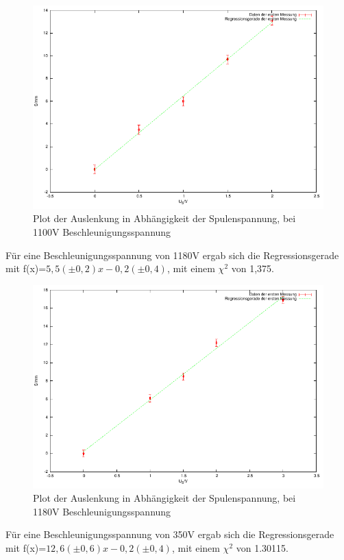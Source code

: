 \documentclass[12pt]{scrartcl}
\begin{document}
\begin{figure}[htbp] 
  \centering
    \includegraphics[scale = 1]{b_1.pdf}
  	\caption[Plot der Auslenkung in Abhängigkeit der Spulenspannung, bei 1100V Beschleunigungsspannung]{Plot der Auslenkung in Abhängigkeit der Spulenspannung, bei 1100V Beschleunigungsspannung}
  \label{fig:x_1}
\end{figure}

\newpage

Für eine Beschleunigungsspannung von 1180V ergab sich die Regressionsgerade mit f(x)=$5,5 (\pm 0,2) x  - 0,2 (\pm 0,4)$, mit einem $\chi^2$ von 1,375.

\begin{figure}[htbp] 
  \centering
    \includegraphics[scale = 1]{b_2.pdf}
  	\caption[Plot der Auslenkung in Abhängigkeit der Spulenspannung, bei 1180V Beschleunigungsspannung]{Plot der Auslenkung in Abhängigkeit der Spulenspannung, bei 1180V Beschleunigungsspannung}
  \label{fig:x_1}
\end{figure}
\newpage
Für eine Beschleunigungsspannung von 350V ergab sich die Regressionsgerade mit f(x)=$12,6 (\pm 0,6) x  - 0,2 (\pm 0,4)$, mit einem $\chi^2$ von 1.30115.
\end{document}
